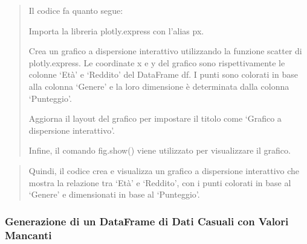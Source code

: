 \documentclass[11pt]{article}
\begin{document}
    
    
    
    
    \begin{quote}
Il codice fa quanto segue:

Importa la libreria plotly.express con l'alias px.

Crea un grafico a dispersione interattivo utilizzando la funzione
scatter di plotly.express. Le coordinate x e y del grafico sono
rispettivamente le colonne `Età' e `Reddito' del DataFrame df. I punti
sono colorati in base alla colonna `Genere' e la loro dimensione è
determinata dalla colonna `Punteggio'.

Aggiorna il layout del grafico per impostare il titolo come `Grafico a
dispersione interattivo'.

Infine, il comando fig.show() viene utilizzato per visualizzare il
grafico.
\end{quote}

\begin{quote}
Quindi, il codice crea e visualizza un grafico a dispersione interattivo
che mostra la relazione tra `Età' e `Reddito', con i punti colorati in
base al `Genere' e dimensionati in base al `Punteggio'.
\end{quote}

    \subsubsection{Generazione di un DataFrame di Dati Casuali con Valori
Mancanti}\label{generazione-di-un-dataframe-di-dati-casuali-con-valori-mancanti}
\end{document}

